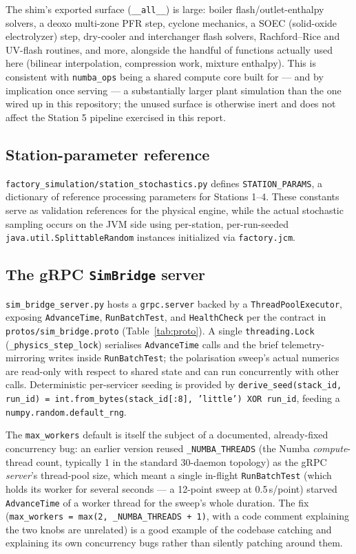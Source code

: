 \documentclass[twocolumn,10pt,a4paper]{article}
\newcommand{\code}[1]{\texttt{\small #1}}
\newcommand{\file}[1]{\texttt{#1}}
\begin{document}
The shim's exported surface (\code{\_\_all\_\_}) is large: boiler flash/outlet-enthalpy solvers, a deoxo multi-zone PFR step, cyclone mechanics, a SOEC (solid-oxide electrolyzer) step, dry-cooler and interchanger flash solvers, Rachford--Rice and UV-flash routines, and more, alongside the handful of functions actually used here (bilinear interpolation, compression work, mixture enthalpy). This is consistent with \code{numba\_ops} being a shared compute core built for --- and by implication once serving --- a substantially larger plant simulation than the one wired up in this repository; the unused surface is otherwise inert and does not affect the Station 5 pipeline exercised in this report.

\subsection{Station-parameter reference}
\label{sec:stationdrift}
\file{factory\_simulation/station\_stochastics.py} defines \code{STATION\_PARAMS}, a dictionary of reference processing parameters for Stations 1--4. These constants serve as validation references for the physical engine, while the actual stochastic sampling occurs on the JVM side using per-station, per-run-seeded \code{java.util.SplittableRandom} instances initialized via \file{factory.jcm}.

\subsection{The gRPC \code{SimBridge} server}
\label{sec:grpc-server}
\code{sim\_bridge\_server.py} hosts a \code{grpc.server} backed by a \code{ThreadPoolExecutor}, exposing \code{AdvanceTime}, \code{RunBatchTest}, and \code{HealthCheck} per the contract in \file{protos/sim\_bridge.proto} (Table~\ref{tab:proto}). A single \code{threading.Lock} (\code{\_physics\_step\_lock}) serialises \code{AdvanceTime} calls and the brief telemetry-mirroring writes inside \code{RunBatchTest}; the polarisation sweep's actual numerics are read-only with respect to shared state and can run concurrently with other calls. Deterministic per-servicer seeding is provided by \code{derive\_seed(stack\_id, run\_id) = int.from\_bytes(stack\_id[:8], 'little') XOR run\_id}, feeding a \code{numpy.random.default\_rng}.

\begin{strengthbox}
The \code{max\_workers} default is itself the subject of a documented, already-fixed concurrency bug: an earlier version reused \code{\_NUMBA\_THREADS} (the Numba \emph{compute}-thread count, typically 1 in the standard 30-daemon topology) as the gRPC \emph{server}'s thread-pool size, which meant a single in-flight \code{RunBatchTest} (which holds its worker for several seconds --- a 12-point sweep at 0.5\,s/point) starved \code{AdvanceTime} of a worker thread for the sweep's whole duration. The fix (\code{max\_workers = max(2, \_NUMBA\_THREADS + 1)}, with a code comment explaining the two knobs are unrelated) is a good example of the codebase catching and explaining its own concurrency bugs rather than silently patching around them.
\end{strengthbox}
\end{document}
